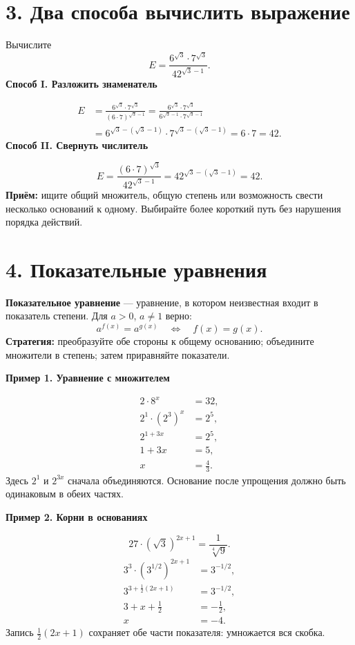 \documentclass[a4paper,12pt]{article}
\newcommand{\key}[1]{\textcolor{darkaccent}{\textbf{#1}}}
\newcommand{\sub}[1]{\medskip\noindent\textcolor{darkaccent}{\large\bfseries #1}\par\vspace{2pt}}
\begin{document}
\section*{3. Два способа вычислить выражение}
Вычислите
\[
 E=\frac{6^{\sqrt3}\cdot7^{\sqrt3}}{42^{\sqrt3-1}}.
\]
\sub{Способ I. Разложить знаменатель}
\[
\begin{aligned}
 E&=\frac{6^{\sqrt3}\cdot7^{\sqrt3}}{(6\cdot7)^{\sqrt3-1}}
 =\frac{6^{\sqrt3}\cdot7^{\sqrt3}}
 {6^{\sqrt3-1}\cdot7^{\sqrt3-1}}\\
 &=6^{\sqrt3-(\sqrt3-1)}\cdot7^{\sqrt3-(\sqrt3-1)}
 =6\cdot7=42.
\end{aligned}
\]
\sub{Способ II. Свернуть числитель}
\[
 E=\frac{(6\cdot7)^{\sqrt3}}{42^{\sqrt3-1}}
 =42^{\sqrt3-(\sqrt3-1)}=42.
\]
\key{Приём:} ищите общий множитель, общую степень или возможность свести несколько оснований к одному. Выбирайте более короткий путь без нарушения порядка действий.

\section*{4. Показательные уравнения}
\key{Показательное уравнение} --- уравнение, в котором неизвестная входит в показатель степени. Для $a>0$, $a\ne1$ верно:
\[
 \boxed{a^{f(x)}=a^{g(x)}\quad\Longleftrightarrow\quad f(x)=g(x).}
\]
\key{Стратегия:} преобразуйте обе стороны к общему основанию; объедините множители в степень; затем приравняйте показатели.

\sub{Пример 1. Уравнение с множителем}
\[
\begin{aligned}
 2\cdot8^x&=32,\\
 2^1\cdot(2^3)^x&=2^5,\\
 2^{1+3x}&=2^5,\\
 1+3x&=5,\\
 x&=\frac43.
\end{aligned}
\]
Здесь $2^1$ и $2^{3x}$ сначала объединяются. Основание после упрощения должно быть одинаковым в обеих частях.

\sub{Пример 2. Корни в основаниях}
\[
 27\cdot(\sqrt3)^{2x+1}=\frac1{\sqrt[4]{9}}.
\]
\[
\begin{aligned}
 3^3\cdot(3^{1/2})^{2x+1}&=3^{-1/2},\\
 3^{3+\frac12(2x+1)}&=3^{-1/2},\\
 3+x+\frac12&=-\frac12,\\
 x&=-4.
\end{aligned}
\]
Запись $\frac12(2x+1)$ сохраняет обе части показателя: умножается вся скобка.
\end{document}
